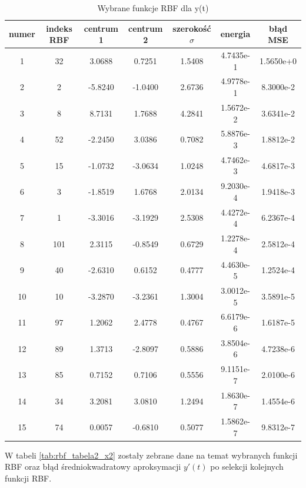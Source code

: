 \begin{table}[ht!]
\centering

\begin{tabular}{ |c| c| c| c| c| c| c| }
\hline
numer & indeks RBF & centrum 1 & centrum 2 & szerokość $\sigma$ & energia      & błąd MSE    \\ \hline    
    1 &  32 &   3.0688  &  0.7251  &  1.5408  &  4.7435e-1 & 1.5650e+0 \\
    2 &   2 &  -5.8240  & -1.0400  &  2.6736  &  4.9778e-1 & 8.3000e-2 \\
    3 &   8 &   8.7131  &  1.7688  &  4.2841  &  1.5672e-2 & 3.6341e-2 \\
    4 &  52 &  -2.2450  &  3.0386  &  0.7082  &  5.8876e-3 & 1.8812e-2 \\
    5 &  15 &  -1.0732  & -3.0634  &  1.0248  &  4.7462e-3 & 4.6817e-3 \\
    6 &   3 &  -1.8519  &  1.6768  &  2.0134  &  9.2030e-4 & 1.9418e-3 \\
    7 &   1 &  -3.3016  & -3.1929  &  2.5308  &  4.4272e-4 & 6.2367e-4 \\
    8 & 101 &   2.3115  & -0.8549  &  0.6729  &  1.2278e-4 & 2.5812e-4 \\
    9 &  40 &  -2.6310  &  0.6152  &  0.4777  &  4.4630e-5 & 1.2524e-4 \\
   10 &  10 &  -3.2870  & -3.2361  &  1.3004  &  3.0012e-5 & 3.5891e-5 \\
   11 &  97 &   1.2062  &  2.4778  &  0.4767  &  6.6179e-6 & 1.6187e-5 \\
   12 &  89 &   1.3713  & -2.8097  &  0.5886  &  3.8504e-6 & 4.7238e-6 \\
   13 &  85 &   0.7152  &  0.7106  &  0.5556  &  9.1151e-7 & 2.0100e-6 \\
   14 &  34 &   3.2081  &  3.0810  &  1.2494  &  1.8630e-7 & 1.4554e-6 \\
   15 &  74 &   0.0057  & -0.6810  &  0.5077  &  1.5862e-7 & 9.8312e-7 \\
\hline
\end{tabular}

\caption{Wybrane funkcje RBF dla y(t)}
\label{tab:rbf_tabela2_x1}
\end{table}


W tabeli \ref{tab:rbf_tabela2_x2} zostały zebrane dane na temat wybranych funkcji RBF oraz błąd średniokwadratowy aproksymacji $y'(t)$ po selekcji kolejnych funkcji RBF.


